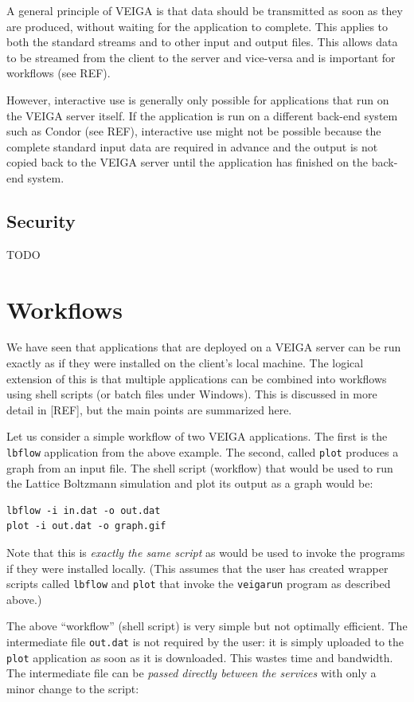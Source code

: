 \documentclass[a4paper]{article}
\begin{document}
\begin{multicols}{2}
A general principle of VEIGA is that data should be transmitted as soon as they are produced, without waiting for the application to complete.  This applies to both the standard streams and to other input and output files.  This allows data to be streamed from the client to the server and vice-versa and is important for workflows (see REF).

However, interactive use is generally only possible for applications that run on the VEIGA server itself.  If the application is run on a different back-end system such as Condor (see REF), interactive use might not be possible because the complete standard input data are required in advance and the output is not copied back to the VEIGA server until the application has finished on the back-end system.

\subsection{Security}
TODO

\section{Workflows}\label{sec:workflows}
We have seen that applications that are deployed on a VEIGA server can be run exactly as if they were installed on the client's local machine.  The logical extension of this is that multiple applications can be combined into workflows using shell scripts (or batch files under Windows).  This is discussed in more detail in [REF], but the main points are summarized here.

Let us consider a simple workflow of two VEIGA applications.  The first is the {\tt lbflow} application from the above example.  The second, called {\tt plot} produces a graph from an input file.  The shell script (workflow) that would be used to run the Lattice Boltzmann simulation and plot its output as a graph would be:

\begin{verbatim}
lbflow -i in.dat -o out.dat
plot -i out.dat -o graph.gif
\end{verbatim}

Note that this is {\em exactly the same script\/} as would be used to invoke the programs if they were installed locally.  (This assumes that the user has created wrapper scripts called {\tt lbflow} and {\tt plot} that invoke the {\tt veigarun} program as described above.)

The above ``workflow'' (shell script) is very simple but not optimally efficient.  The intermediate file {\tt out.dat} is not required by the user: it is simply uploaded to the {\tt plot} application as soon as it is downloaded.  This wastes time and bandwidth.  The intermediate file can be {\em passed directly between the services\/} with only a minor change to the script:


\end{multicols}
\end{document}
